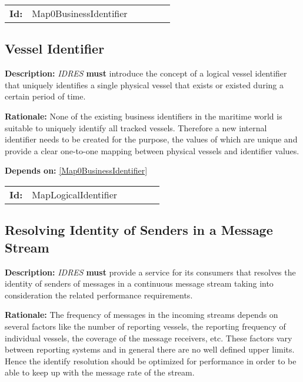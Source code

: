 \par
{\small \begin{center}\begin{tabular}{rlrlrl}
\textbf{Id:} & Map0BusinessIdentifier  & & & \end{tabular}\end{center} }

\subsection{Vessel Identifier}\label{MapLogicalIdentifier}
\textbf{Description:} \textsl{IDRES} \textbf{must} introduce the concept of a logical vessel identifier that uniquely identifies a single physical vessel that  exists or existed during a certain period of time.

\textbf{Rationale:} None of the existing business identifiers in the maritime world is suitable to uniquely identify all tracked vessels. Therefore a new   internal identifier needs to be created for the purpose, the values of which  are unique and provide a clear one-to-one mapping between physical vessels and identifier values. 

\textbf{Depends on:} \ref{Map0BusinessIdentifier} 

\par
{\small \begin{center}\begin{tabular}{rlrlrl}
\textbf{Id:} & MapLogicalIdentifier  & & & \end{tabular}\end{center} }

\subsection{Resolving Identity of Senders in a Message Stream}\label{MapMessageStreamResolution}
\textbf{Description:} \textsl{IDRES} \textbf{must} provide a service for its  consumers that resolves the identity of senders of messages in a  continuous message stream taking into consideration the related performance requirements.

\textbf{Rationale:} The frequency of messages in the incoming streams depends on several factors like the number of reporting vessels, the reporting frequency of individual vessels, the coverage of the message receivers, etc. These factors vary between reporting systems and in general there are no well defined upper limits. Hence the identify resolution should be optimized for performance in order to be able to keep up with the message rate of the stream.

